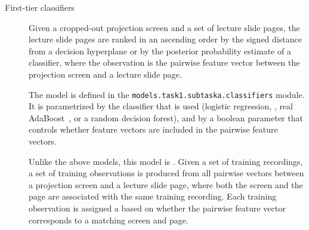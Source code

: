 \begin{description}
  \item[First-tier classifiers]
    Given a cropped-out projection screen and a set of lecture slide
    pages, the lecture slide pages are ranked in an ascending order by the
    signed distance from a decision hyperplane or by the posterior probability
    estimate of a classifier, where the observation is the pairwise feature
    vector between the projection screen and a lecture slide page.

    The model is defined in the \texttt{models.task1.subtaska.classifiers}
    module. It is parametrized by the classifier that is used (logistic
    regression, , real AdaBoost~\cite{friedman2000additive}, or a
    random decision forest), and by a boolean parameter that controls whether
     feature vectors are included in the pairwise feature vectors.

    Unlike the above models, this model is . Given a set of
    training recordings, a set of training observations is produced from all
    pairwise vectors between a projection screen and a lecture slide page,
    where both the screen and the page are associated with the same training
    recording. Each training observation is assigned a  based on
    whether the pairwise feature vector corresponds to a matching screen and
    page.
    

\end{description}
